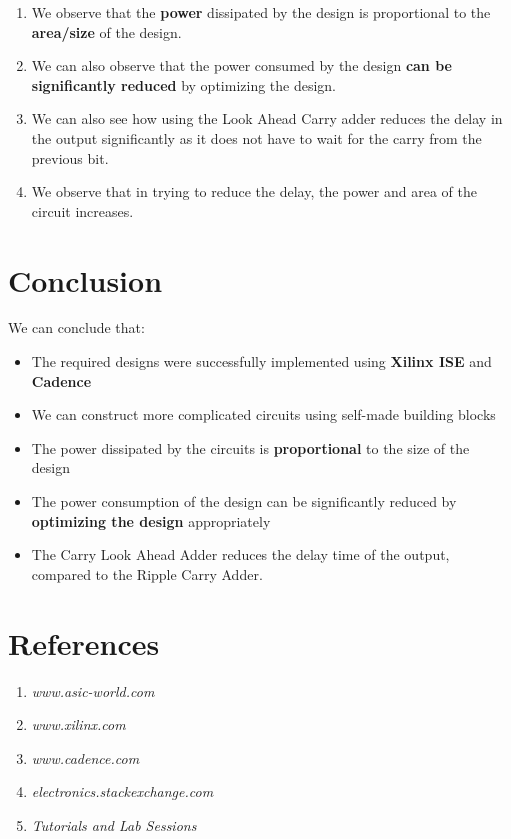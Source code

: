 \documentclass[a4paper,10pt]{report}
\begin{document}
\begin{enumerate}
	\item We observe that the \textbf{power} dissipated by the design is proportional to the \textbf{area/size} of the design.
	\item We can also observe that the power consumed by the design \textbf{can be significantly reduced} by optimizing the design.
	\item We can also see how using the Look Ahead Carry adder reduces the delay in the output significantly as it does not have to wait for the carry
		from the previous bit.
	\item We observe that in trying to reduce the delay, the power and area of the circuit increases.
\end{enumerate}

\section{Conclusion}

We can conclude that:
\begin{itemize}
	\item The required designs were successfully implemented using \textbf{Xilinx ISE} and \textbf{Cadence}
	\item We can construct more complicated circuits using self-made building blocks
	\item The power dissipated by the circuits is \textbf{proportional} to the size of the design
	\item The power consumption of the design can be significantly reduced by \textbf{optimizing the design} appropriately
	\item The Carry Look Ahead Adder reduces the delay time of the output, compared to the Ripple Carry Adder.
\end{itemize}

\section{References}
\begin{enumerate}
	\item \textit{www.asic-world.com}
	\item \textit{www.xilinx.com}
	\item \textit{www.cadence.com}
	\item \textit{electronics.stackexchange.com}
	\item \textit{Tutorials and Lab Sessions}
\end{enumerate}
\end{document}
